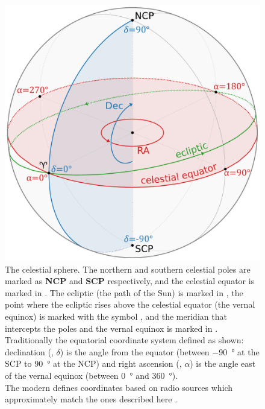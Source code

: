 \begin{colsection}
\begin{colsection}
\makeatletter
\setlength{\@fptop}{0pt}
\makeatother

\begin{figure}[t]
    \begin{center}
        \includegraphics[width=\linewidth]{images/globe1.pdf}
    \end{center}
    \caption[The celestial sphere]{
        The celestial sphere. The northern and southern celestial poles are marked as \textbf{NCP}  and \textbf{SCP}  respectively, and the celestial equator is marked in . The ecliptic (the path of the Sun) is marked in , the point where the ecliptic rises above the celestial equator (the vernal equinox) is marked with the symbol \Aries{}, and the meridian that intercepts the poles and the vernal equinox is marked in .\\
        Traditionally the equatorial coordinate system defined as shown: declination (, $\delta$) is the angle from the equator (between \SI{-90}{\degree} at the SCP to \SI{90}{\degree} at the NCP) and right ascension (, $\alpha$)  is the angle east of the vernal equinox (between \SI{0}{\degree} and \SI{360}{\degree}). \\
        The modern  defines coordinates based on radio sources which approximately match the ones described here \citep{ICRF}.
    }\label{fig:sphere}
\end{figure}


\end{colsection}
\end{colsection}
